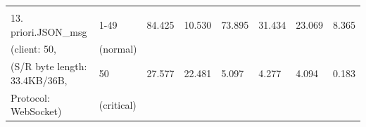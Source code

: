 \begin{table}[htbp]
\begin{tabular}{m{} m{} m{} m{} m{} m{} m{} m{}}
        & & & & & & &\\
        13. priori.JSON\_msg          & 1-49       & 84.425  & 10.530 & 73.895  & 31.434  & 23.069 & 8.365   \\
        (client: 50,                  & (normal)   &         &        &         &         &        &         \\
        (S/R byte length: 33.4KB/36B, & 50         & 27.577  & 22.481 & 5.097   & 4.277   & 4.094  & 0.183   \\
        Protocol: WebSocket)          & (critical) &         &        &         &         &        &         \\ \hline                   
    \end{tabular}%
    
    \end{table}




